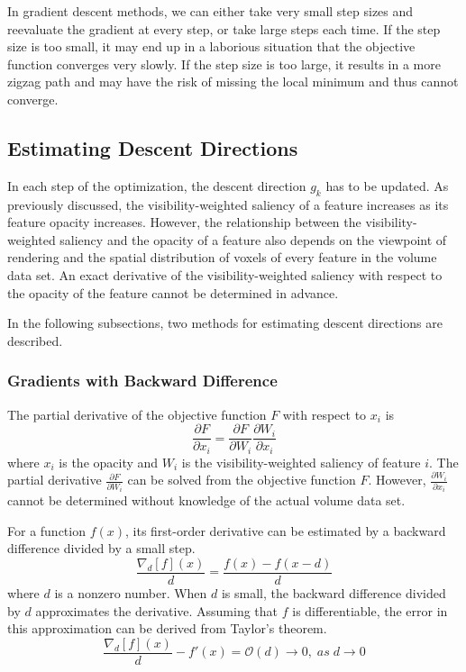 In gradient descent methods, we can either take very small step sizes and reevaluate the gradient at every step, or take large steps each time. If the step size is too small, it may end up in a laborious situation that the objective function converges very slowly. If the step size is too large, it results in a more zigzag path and may have the risk of missing the local minimum and thus cannot converge.

\subsection{Estimating Descent Directions \label{estimating_descent_directions}}
In each step of the optimization, the descent direction $ g_{k} $ has to be updated. 
As previously discussed, the visibility-weighted saliency of a feature increases as its feature opacity increases. 
However, the relationship between the visibility-weighted saliency and the opacity of a feature also depends on the viewpoint of rendering and the spatial distribution of voxels of every feature in the volume data set. An exact derivative of the visibility-weighted saliency with respect to the opacity of the feature cannot be determined in advance.

In the following subsections, two methods for estimating descent directions are described.

\subsubsection{Gradients with Backward Difference}
The partial derivative of the objective function $ F $ with respect to $ x_{i} $ is
\[ \frac{\partial F}{\partial x_{i}} = \frac{\partial F}{\partial W_{i}} \frac{\partial W_{i}}{\partial x_{i}} \]
where $ x_{i} $ is the opacity and $ W_{i} $ is the visibility-weighted saliency of feature $ i $.
The partial derivative $ \frac{\partial F}{\partial W_{i}} $ can be solved from the objective function $ F $.
However, $ \frac{\partial W_{i}}{\partial x_{i}} $ cannot be determined without knowledge of the actual volume data set.

For a function $ f(x) $, its first-order derivative can be estimated by a backward difference divided by a small step.
\[ \frac{\nabla_{d}[f](x)}{d}=\frac{f(x)-f(x-d)}{d} \]
where $ d $ is a nonzero number.
When $ d $ is small, the backward difference divided by $ d $ approximates the derivative. Assuming that $ f $ is differentiable, the error in this approximation can be derived from Taylor's theorem.
\[ \frac{\nabla_{d}[f](x)}{d}-f'(x)=\mathcal{O}(d) \to 0 , \; as \; d \to 0 \]

